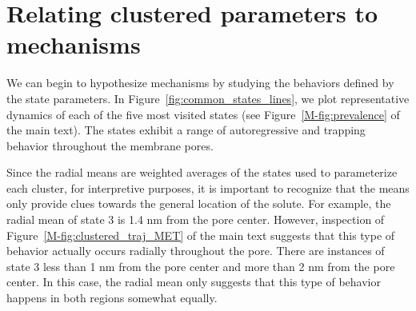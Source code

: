 \documentclass{article}
\begin{document}
%  
  
  \section{Relating clustered parameters to mechanisms}\label{section:clustered_parmeters}
  
  We can begin to hypothesize mechanisms by studying the behaviors defined by the 
  state parameters. In Figure~\ref{fig:common_states_lines}, we plot representative 
  dynamics of each of the five most visited states (see Figure~\ref{M-fig:prevalence}
  of the main text). The states exhibit a range of autoregressive and trapping 
  behavior throughout the membrane pores.
  
  Since the radial means are weighted averages of the states used to parameterize
  each cluster, for interpretive purposes, it is important to recognize that the means
  only provide clues towards the general location of the solute. For example, the 
  radial mean of state 3 is 1.4 nm from the pore center. However, inspection of 
  Figure~\ref{M-fig:clustered_traj_MET} of the main text suggests that this type of behavior actually
  occurs radially throughout the pore. There are instances of state 3 less than 1 nm
  from the pore center and more than 2 nm from the pore center. In this case, the 
  radial mean only suggests that this type of behavior happens in both regions somewhat
  equally.
  
\end{document}
